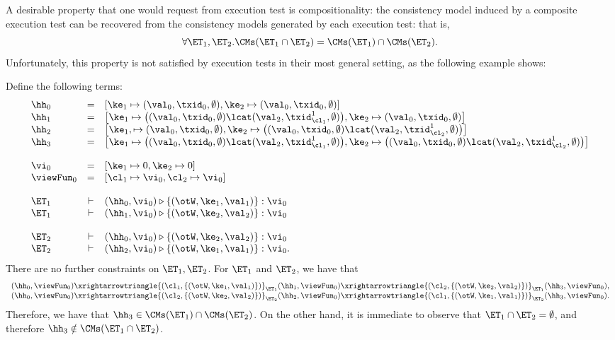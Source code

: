 A desirable property that one would request from execution 
test is compositionality: the consistency model induced by 
a composite execution test can be recovered from the consistency 
models generated by each execution test: that is, 
\[ 
\forall \ET_1, \ET_2. \CMs(\ET_1 \cap \ET_2) = \CMs(\ET_1) \cap \CMs(\ET_2).
\]
Unfortunately, this property is not satisfied by execution tests in their 
most general setting, as the following example shows: 
\begin{example}
\label{ex:noncompositional.et}
Define the following terms: 
\[
\begin{array}{lcl}
\hh_0 &=& [\ke_1 \mapsto (\val_0, \txid_0, \emptyset) , \ke_2 \mapsto (\val_0, \txid_0, \emptyset)]\\
\hh_1 &=& \big[\ke_1 \mapsto \big( (\val_0, \txid_0, \emptyset) \lcat (\val_2, \txid_{\cl_1}^{1}, \emptyset)\big) , \ke_2 \mapsto (\val_0, \txid_0, \emptyset) \big]\\
\hh_2 &=& \big[\ke_1, \mapsto (\val_0, \txid_0, \emptyset), \ke_2 \mapsto \big( (\val_0, \txid_0, \emptyset) \lcat (\val_2, \txid_{\cl_2}^{1}, \emptyset) \big) \big]\\
\hh_3 &=& \big[\ke_1 \mapsto \big( (\val_0, \txid_0, \emptyset) \lcat (\val_2, \txid_{\cl_1}^{1}, \emptyset)\big), 
                         \ke_2 \mapsto \big( (\val_0, \txid_0, \emptyset) \lcat (\val_2, \txid_{\cl_2}^{1}, \emptyset) \big) \big]\\
&&\\
\vi_0 &=& [\ke_1 \mapsto 0, \ke_2 \mapsto 0]\\
\viewFun_0 &=& [\cl_1 \mapsto \vi_0, \cl_2 \mapsto \vi_0]\\
&&\\
\ET_1 &\vdash& (\hh_0, \vi_0) \triangleright \{(\otW, \ke_1, \val_1)\} : \vi_0\\
\ET_1 &\vdash& (\hh_1, \vi_0) \triangleright \{(\otW, \ke_2, \val_2)\} : \vi_0\\
&&\\
\ET_2 &\vdash& (\hh_0, \vi_0) \triangleright \{(\otW, \ke_2, \val_2)\} : \vi_0\\
\ET_2 &\vdash& (\hh_2, \vi_0) \triangleright \{(\otW, \ke_1, \val_1)\} : \vi_0.
\end{array}
\]
There are no further constraints on $\ET_1, \ET_2$.
For $\ET_1$ and $\ET_2$, we have that 
\[
\begin{array}{l}
(\hh_0, \viewFun_0) \xrightarrowtriangle{(\cl_1, \{(\otW, \ke_1, \val_1)\})}_{\ET_1} 
(\hh_1, \viewFun_0) \xrightarrowtriangle{(\cl_2, \{(\otW, \ke_2, \val_2)\})}_{\ET_1} (\hh_3, \viewFun_0), \\
(\hh_0, \viewFun_0) \xrightarrowtriangle{(\cl_2, \{(\otW, \ke_2, \val_2)\})}_{\ET_2} 
(\hh_2, \viewFun_0) \xrightarrowtriangle{(\cl_1, \{(\otW, \ke_1, \val_1)\})}_{\ET_2} (\hh_3, \viewFun_0).\\
\end{array}
\] 
Therefore, we have that $\hh_3 \in \CMs(\ET_1) \cap \CMs(\ET_2)$. On the other hand, it is immediate 
to observe that $\ET_1 \cap \ET_2 = \emptyset$, and therefore $\hh_3 \notin \CMs(\ET_1 \cap \ET_2)$.
\end{example}

